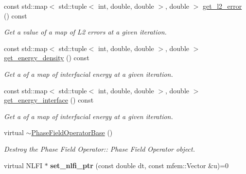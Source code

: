\begin{DoxyCompactItemize}
const std\+::map$<$ std\+::tuple$<$ int, double, double $>$, double $>$ \hyperlink{classPhaseFieldOperatorBase_adc993d94274e82bc06f9555fbecbd310}{get\+\_\+l2\+\_\+error} () const
\begin{DoxyCompactList}\small\item\em Get a value of a map of L2 errors at a given iteration. \end{DoxyCompactList}\item 
const std\+::map$<$ std\+::tuple$<$ int, double, double $>$, double $>$ \hyperlink{classPhaseFieldOperatorBase_a8428da5d747f60f7ccbd79c879ca8d25}{get\+\_\+energy\+\_\+density} () const
\begin{DoxyCompactList}\small\item\em Get a of a map of interfacial energy at a given iteration. \end{DoxyCompactList}\item 
const std\+::map$<$ std\+::tuple$<$ int, double, double $>$, double $>$ \hyperlink{classPhaseFieldOperatorBase_ac194823660f85a12d8edcf4520bbc025}{get\+\_\+energy\+\_\+interface} () const
\begin{DoxyCompactList}\small\item\em Get a of a map of interfacial energy at a given iteration. \end{DoxyCompactList}\item 
\mbox{\label{classPhaseFieldOperatorBase_a2fa886ac479aa0a808a4adf57ad294ec}} 
virtual \hyperlink{classPhaseFieldOperatorBase_a2fa886ac479aa0a808a4adf57ad294ec}{$\sim$\+Phase\+Field\+Operator\+Base} ()
\begin{DoxyCompactList}\small\item\em Destroy the Phase Field Operator\+:\+: Phase Field Operator object. \end{DoxyCompactList}\item 
\mbox{\label{classPhaseFieldOperatorBase_a6defeb100c4fecbd35b8591533191bc7}} 
virtual N\+L\+FI $\ast$ {\bfseries set\+\_\+nlfi\+\_\+ptr} (const double dt, const mfem\+::\+Vector \&u)=0
\end{DoxyCompactItemize}
